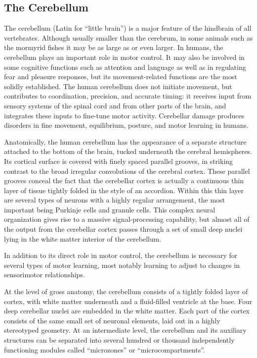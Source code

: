 \hypertarget{the-cerebellum}{%
\subsection{The Cerebellum}\label{the-cerebellum}}

The cerebellum (Latin for ``little brain'') is a major feature of the hindbrain of all vertebrates. Although usually smaller than the cerebrum, in some animals such as the mormyrid fishes it may be as large as or even larger. In humans, the cerebellum plays an important role in motor control. It may also be involved in some cognitive functions such as attention and language as well as in regulating fear and pleasure responses, but its movement-related functions are the most solidly established. The human cerebellum does not initiate movement, but contributes to coordination, precision, and accurate timing: it receives input from sensory systems of the spinal cord and from other parts of the brain, and integrates these inputs to fine-tune motor activity. Cerebellar damage produces disorders in fine movement, equilibrium, posture, and motor learning in humans.

Anatomically, the human cerebellum has the appearance of a separate structure attached to the bottom of the brain, tucked underneath the cerebral hemispheres. Its cortical surface is covered with finely spaced parallel grooves, in striking contrast to the broad irregular convolutions of the cerebral cortex. These parallel grooves conceal the fact that the cerebellar cortex is actually a continuous thin layer of tissue tightly folded in the style of an accordion. Within this thin layer are several types of neurons with a highly regular arrangement, the most important being Purkinje cells and granule cells. This complex neural organization gives rise to a massive signal-processing capability, but almost all of the output from the cerebellar cortex passes through a set of small deep nuclei lying in the white matter interior of the cerebellum.

In addition to its direct role in motor control, the cerebellum is necessary for several types of motor learning, most notably learning to adjust to changes in sensorimotor relationships.

At the level of gross anatomy, the cerebellum consists of a tightly folded layer of cortex, with white matter underneath and a fluid-filled ventricle at the base. Four deep cerebellar nuclei are embedded in the white matter. Each part of the cortex consists of the same small set of neuronal elements, laid out in a highly stereotyped geometry. At an intermediate level, the cerebellum and its auxiliary structures can be separated into several hundred or thousand independently functioning modules called ``microzones'' or ``microcompartments''.

